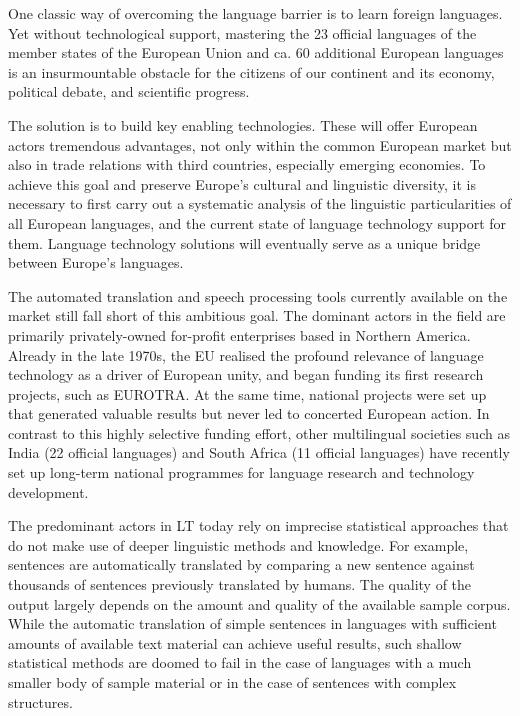 \documentclass[]{../../metanetpaper}
\begin{document}
\begin{Parallel}[c]{70mm}{70mm}
{One classic way of overcoming the language barrier is to learn foreign
languages. Yet without technological support, mastering the 23
official languages of the member states of the European Union and
ca. 60 additional European languages is an insurmountable obstacle for
the citizens of our continent and its economy, political debate, and
scientific progress.

The solution is to build key enabling technologies. These will offer European
actors tremendous advantages, not only within the common European market but
also in trade relations with third countries, especially emerging economies. To
achieve this goal and preserve Europe’s cultural and linguistic diversity, it
is necessary to first carry out a systematic analysis of the linguistic
particularities of all European languages, and the current state of language
technology support for them. Language technology solutions will eventually
serve as a unique bridge between Europe’s languages.


The automated translation and speech processing tools currently available on
the market still fall short of this ambitious goal. The dominant actors in the
field are primarily privately-owned for-profit enterprises based in Northern
America. Already in the late 1970s, the EU realised the profound relevance of
language technology as a driver of European unity, and began funding its first
research projects, such as EUROTRA. At the same time, national projects were
set up that generated valuable results but never led to concerted European
action. In contrast to this highly selective funding effort, other multilingual
societies such as India (22 official languages) and South Africa (11 official
languages) have recently set up long-term national programmes for language
research and technology development.

The predominant actors in LT today rely on imprecise statistical approaches
that do not make use of deeper linguistic methods and knowledge. For example,
sentences are automatically translated by comparing a new sentence against
thousands of sentences previously translated by humans. The quality of the
output largely depends on the amount and quality of the available sample
corpus. While the automatic translation of simple sentences in languages with
sufficient amounts of available text material can achieve
useful results, such shallow statistical methods
are doomed to fail in the case of languages with a much smaller body of sample
material or in the case of sentences with complex
structures.

}
\end{Parallel}
\end{document}
